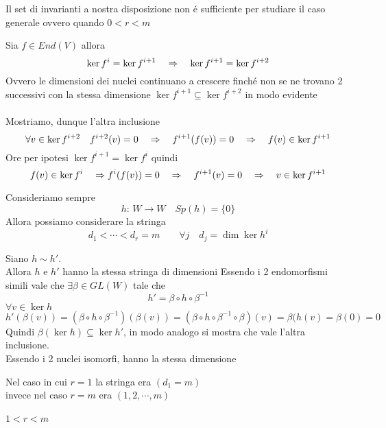 Il set di invarianti a nostra disposizione non \'e sufficiente per studiare il caso generale ovvero quando $0 < r < m $
\begin{lem}\bianco 
Sia $f\in End(V) $ allora
$$ \ker f^i = \ker f^{i+1} \quad \Rightarrow \quad \ker f^{i+1} = \ker f^{i+2}$$
Ovvero le dimensioni dei nuclei continuano a crescere finch\'e non se ne trovano 2 successivi con la stessa dimensione
\proof $\ker f^{i+1} \subseteq \ker f^{i+2} $ in modo evidente\\ \\
Mostriamo, dunque l'altra inclusione
$$ \forall v \in \ker f^{i+2}  \quad f^{i+2}(v) =0 \quad \Rightarrow \quad f^{i+1 } (f(v))=0 \quad \Rightarrow \quad f(v) \in \ker f^{i+1} $$ 
Ore per ipotesi $\ker f^{i+1} = \ker f^i$ quindi 
$$ f(v) \in \ker f^i \quad \Rightarrow f^i ( f(v))=0 \quad \Rightarrow \quad f^{i+1}(v)=0 \quad \Rightarrow \quad v\in \ker f^{i+1}$$
\endproof
\end{lem}

\spazio 
Consideriamo sempre 
$$ h:\, W \to W \quad Sp(h)=\{ 0\} $$ 
Allora possiamo considerare la stringa
$$d_1<\cdots < d_r=m \qquad \forall j \quad d_j=\dim \ker h^i $$ 

\begin{lem}
Siano $h \sim h' $.\\
Allora $h$ e $h'$ hanno la stessa stringa di dimensioni
\proof
Essendo i 2 endomorfismi simili vale che $\exists \beta \in GL(W) $ tale che
$$ h' = \beta \circ h \circ \beta^{-1} $$
$\forall v \in \ker h $ 
$$ h'(\beta (v)) = ( \beta \circ h\circ \beta^{-1})(\beta (v))= ( \beta \circ h\circ \beta^{-1} \circ \beta )(v) = \beta(h(v)=\beta(0)=0$$
Quindi $\beta (\ker h )\subseteq \ker h'$, in modo analogo si mostra che vale l'altra inclusione.\\
Essendo i 2 nuclei isomorfi, hanno la stessa dimensione \endproof
\end{lem}
\begin{oss} Nel caso in cui $r=1$ la stringa era $(d_1=m)$ \\invece nel caso $r=m$ era $(1,2,\cdots, m ) $\end{oss} 
\newpage
\paragraph*{$1<r<m$}


